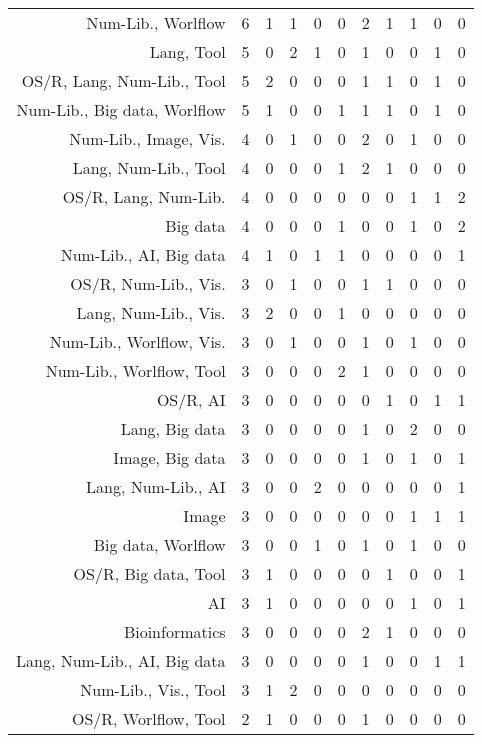 {\begin{landscape}
\begin{longtable}[htb]{r|c|c|c|c|c|c|c|c|c|c}
{Num-Lib., Worlflow} & 6 & 1 & 1 & 0 & 0 & 2 & 1 & 1 & 0 & 0 \\%
{Lang, Tool} & 5 & 0 & 2 & 1 & 0 & 1 & 0 & 0 & 1 & 0 \\%
{OS/R, Lang, Num-Lib., Tool} & 5 & 2 & 0 & 0 & 0 & 1 & 1 & 0 & 1 & 0 \\%
{Num-Lib., Big data, Worlflow} & 5 & 1 & 0 & 0 & 1 & 1 & 1 & 0 & 1 & 0 \\%
{Num-Lib., Image, Vis.} & 4 & 0 & 1 & 0 & 0 & 2 & 0 & 1 & 0 & 0 \\%
{Lang, Num-Lib., Tool} & 4 & 0 & 0 & 0 & 1 & 2 & 1 & 0 & 0 & 0 \\%
{OS/R, Lang, Num-Lib.} & 4 & 0 & 0 & 0 & 0 & 0 & 0 & 1 & 1 & 2 \\%
{Big data} & 4 & 0 & 0 & 0 & 1 & 0 & 0 & 1 & 0 & 2 \\%
{Num-Lib., AI, Big data} & 4 & 1 & 0 & 1 & 1 & 0 & 0 & 0 & 0 & 1 \\%
{OS/R, Num-Lib., Vis.} & 3 & 0 & 1 & 0 & 0 & 1 & 1 & 0 & 0 & 0 \\%
{Lang, Num-Lib., Vis.} & 3 & 2 & 0 & 0 & 1 & 0 & 0 & 0 & 0 & 0 \\%
{Num-Lib., Worlflow, Vis.} & 3 & 0 & 1 & 0 & 0 & 1 & 0 & 1 & 0 & 0 \\%
{Num-Lib., Worlflow, Tool} & 3 & 0 & 0 & 0 & 2 & 1 & 0 & 0 & 0 & 0 \\%
{OS/R, AI} & 3 & 0 & 0 & 0 & 0 & 0 & 1 & 0 & 1 & 1 \\%
{Lang, Big data} & 3 & 0 & 0 & 0 & 0 & 1 & 0 & 2 & 0 & 0 \\%
{Image, Big data} & 3 & 0 & 0 & 0 & 0 & 1 & 0 & 1 & 0 & 1 \\%
{Lang, Num-Lib., AI} & 3 & 0 & 0 & 2 & 0 & 0 & 0 & 0 & 0 & 1 \\%
{Image} & 3 & 0 & 0 & 0 & 0 & 0 & 0 & 1 & 1 & 1 \\%
{Big data, Worlflow} & 3 & 0 & 0 & 1 & 0 & 1 & 0 & 1 & 0 & 0 \\%
{OS/R, Big data, Tool} & 3 & 1 & 0 & 0 & 0 & 0 & 1 & 0 & 0 & 1 \\%
{AI} & 3 & 1 & 0 & 0 & 0 & 0 & 0 & 1 & 0 & 1 \\%
{Bioinformatics} & 3 & 0 & 0 & 0 & 0 & 2 & 1 & 0 & 0 & 0 \\%
{Lang, Num-Lib., AI, Big data} & 3 & 0 & 0 & 0 & 0 & 1 & 0 & 0 & 1 & 1 \\%
{Num-Lib., Vis., Tool} & 3 & 1 & 2 & 0 & 0 & 0 & 0 & 0 & 0 & 0 \\%
{OS/R, Worlflow, Tool} & 2 & 1 & 0 & 0 & 0 & 1 & 0 & 0 & 0 & 0 \\%

\end{longtable}
\end{landscape}}
